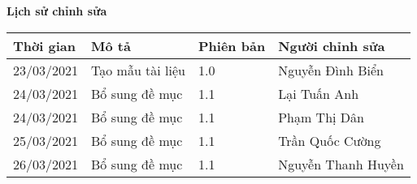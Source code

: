 \documentclass[./main.tex]{subfiles}
\begin{document}
	\begin{center}
		\Large{\textbf{Lịch sử chỉnh sửa}}
		\begin{table}[H]
		\begin{tabular}{|p{}|p{}|p{}|p{}|}
				\hline
				\textbf{Thời gian} & \textbf{Mô tả}   & \textbf{Phiên bản} & \textbf{Người chỉnh sửa}                                                 \\ \hline
				23/03/2021 & Tạo mẫu tài liệu & 1.0 & Nguyễn Đình Biển   \\ \hline
				24/03/2021 & Bổ sung đề mục   & 1.1 & Lại Tuấn Anh       \\ \hline
				24/03/2021 & Bổ sung đề mục   & 1.1 & Phạm Thị Dân       \\ \hline
				25/03/2021 & Bổ sung đề mục   & 1.1 & Trần Quốc Cường    \\ \hline
				26/03/2021 & Bổ sung đề mục   & 1.1 & Nguyễn Thanh Huyền \\ \hline		
			\end{tabular}
		\end{table}
	\end{center}
	
\end{document}
